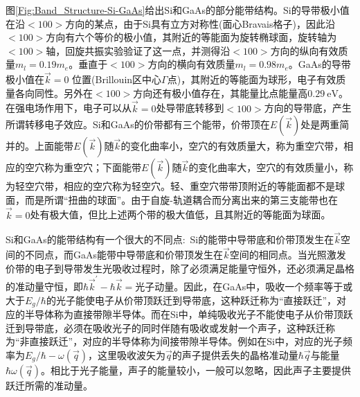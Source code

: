图\ref{Fig:Band_Structure-Si-GaAs}给出Si和GaAs的部分能带结构。Si的导带极小值在沿$<\!100\!>$方向的某点，由于Si具有立方对称性(面心Bravais格子)，因此沿$<\!100\!>$方向有六个等价的极小值，其附近的等能面为旋转椭球面，旋转轴为$<\!100\!>$轴，回旋共振实验验证了这一点，并测得沿$<\!100\!>$方向的纵向有效质量$m_l=0.19m_e$。垂直于$<\!100\!>$方向的横向有效质量$m_l=0.98m_e$。GaAs的导带极小值在$\vec k=0$ 位置(Brillouin区中心$\Gamma$点)，其附近的等能面为球形，电子有效质量各向同性。另外在$<\!100\!>$方向还有极小值存在，其能量比点能量高$0.29~\mathrm{eV}$。在强电场作用下，电子可以从$\vec k=0$处导带底转移到$<\!100\!>$方向的导带底，产生所谓转移电子效应。Si和GaAs的价带都有三个能带，价带顶在$E(\vec k)$处是两重简并的。上面能带$E(\vec k)$随$\vec k$的变化曲率小，空穴的有效质量大，称为重空穴带，相应的空穴称为重空穴；下面能带$E(\vec k)$随$\vec k$的变化曲率大，空穴的有效质量小，称为轻空穴带，相应的空穴称为轻空穴。轻、重空穴带带顶附近的等能面都不是球面，而是所谓``扭曲的球面''。由于自旋-轨道耦合而分离出来的第三支能带也在$\vec k=0$处有极大值，但比上述两个带的极大值低，且其附近的等能面为球面。

Si和GaAs的能带结构有一个很大的不同点:~Si的能带中导带底和价带顶发生在$\vec k$空间的不同点，而GaAs能带中导带底和价带顶发生在$\vec k$空间的相同点。当光照激发价带的电子到导带发生光吸收过程时，除了必须满足能量守恒外，还必须满足晶格的准动量守恒，即$\hbar\vec k^{\prime}-\hbar\vec k=\mbox{光子动量}$。因此，在GaAs中，吸收一个频率等于或大于$E_g/\hbar$的光子能使电子从价带顶跃迁到导带底，这种跃迁称为``直接跃迁''，对应的半导体称为直接带隙半导体。而在Si中，单纯吸收光子不能使电子从价带顶跃迁到导带底，必须在吸收光子的同时伴随有吸收或发射一个声子，这种跃迁称为``非直接跃迁''，对应的半导体称为间接带隙半导体。例如在Si中，对应的光子频率为$E_g/\hbar-\omega(\vec q)$，这里吸收波矢为$\vec q$的声子提供丢失的晶格准动量$\hbar\vec q$与能量$\hbar\omega(\vec q)$。相比于光子能量，声子的能量较小，一般可以忽略，因此声子主要提供跃迁所需的准动量。

